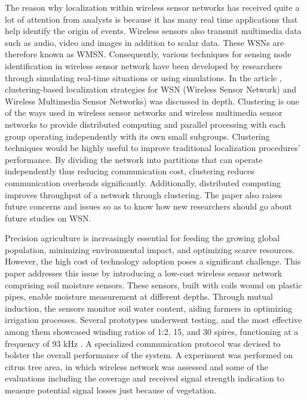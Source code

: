The reason why localization within wireless sensor networks has received quite a lot of attention from analysts is because it has many real time applications that help identify the origin of events. Wireless sensors also transmit multimedia data such as audio, video and images in addition to scalar data. These WSNs are therefore known as WMSN. Consequently, various techniques for sensing node identification in wireless sensor network have been developed by researchers through simulating real-time situations or using simulations. In the article \cite{wajgi2024localization}, clustering-based localization strategies for WSN (Wireless Sensor Network) and Wireless Multimedia Sensor Networks) was discussed in depth. Clustering is one of the ways used in wireless sensor networks and wireless multimedia sensor networks to provide distributed computing and parallel processing with each group operating independently with its own small subgroups. Clustering techniques would be highly useful to improve traditional localization procedures’ performance. By dividing the network into partitions that can operate independently thus reducing communication cost, clustering reduces communication overheads significantly. Additionally, distributed computing improves throughput of a network through clustering. The paper also raises future concerns and issues so as to know how new researchers should go about future studies on WSN.

Precision agriculture is increasingly essential for feeding the growing global population, minimizing environmental impact, and optimizing scarce resources. However, the high cost of technology adoption poses a significant challenge. This paper addresses this issue by introducing a low-cost wireless sensor network comprising soil moisture sensors. These sensors, built with coils wound on plastic pipes, enable moisture measurement at different depths. Through mutual induction, the sensors monitor soil water content, aiding farmers in optimizing irrigation processes. Several prototypes underwent testing, and the most effective among them showcased winding ratios of 1:2, 15, and 30 spires, functioning at a frequency of 93 kHz \cite{lloret2021wireless}. A specialized communication protocol was devised to bolster the overall performance of the system. A experiment was performed on citrus tree area, in which wireless network was assessed and some of the evaluations including the coverage and received signal strength indication to measure potential signal losses just because of vegetation.

